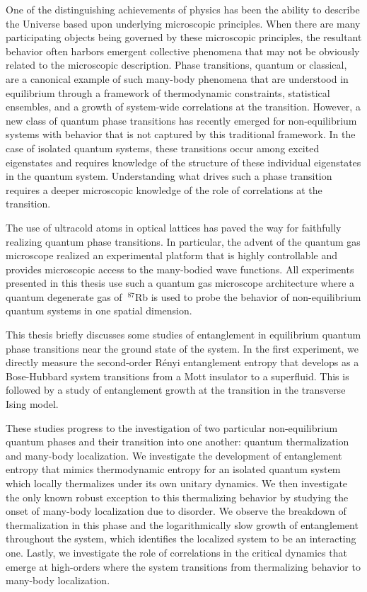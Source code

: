 
One of the distinguishing achievements of physics has been the ability to describe the Universe based upon underlying microscopic principles. When there are many participating objects being governed by these microscopic principles, the resultant behavior often harbors emergent collective phenomena that may not be obviously related to the microscopic description. Phase transitions, quantum or classical, are a canonical example of such many-body phenomena that are understood in equilibrium through a framework of thermodynamic constraints, statistical ensembles, and a growth of system-wide correlations at the transition. However, a new class of quantum phase transitions has recently emerged for non-equilibrium systems with behavior that is not captured by this traditional framework. In the case of isolated quantum systems, these transitions occur among excited eigenstates and requires knowledge of the structure of these individual eigenstates in the quantum system. Understanding what drives such a phase transition requires a deeper microscopic knowledge of the role of correlations at the transition. 

The use of ultracold atoms in optical lattices has paved the way for faithfully realizing quantum phase transitions. In particular, the advent of the quantum gas microscope realized an experimental platform that is highly controllable and provides microscopic access to the many-bodied wave functions. All experiments presented in this thesis use such a quantum gas microscope architecture where a quantum degenerate gas of $~^{87}$Rb is used to probe the behavior of non-equilibrium quantum systems in one spatial dimension.

This thesis briefly discusses some studies of entanglement in equilibrium quantum phase transitions near the ground state of the system. In the first experiment, we directly measure the second-order R\'enyi entanglement entropy that develops as a Bose-Hubbard system transitions from a Mott insulator to a superfluid. This is followed by a study of entanglement growth at the transition in the transverse Ising model. 

These studies progress to the investigation of two particular non-equilibrium quantum phases and their transition into one another: quantum thermalization and many-body localization. We investigate the development of entanglement entropy that mimics thermodynamic entropy for an isolated quantum system which locally thermalizes under its own unitary dynamics. We then investigate the only known robust exception to this thermalizing behavior by studying the onset of many-body localization due to disorder. We observe the breakdown of thermalization in this phase and the logarithmically slow growth of entanglement throughout the system, which identifies the localized system to be an interacting one. Lastly, we investigate the role of correlations in the critical dynamics that emerge at high-orders where the system transitions from thermalizing behavior to many-body localization.

